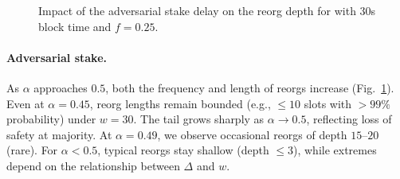 \begin{figure}[htbp!]
\caption{Impact of the adversarial stake delay on the reorg depth for \ProjBase with 30s block time and $f=0.25$.}
\label{fig:adversarial}
\end{figure}

\paragraph{Adversarial stake.}
As $\alpha$ approaches $0.5$, both the frequency and length of reorgs increase (Fig.~\ref{fig:adversarial}). Even at $\alpha=0.45$, reorg lengths remain bounded (e.g., $\le 10$ slots with $>99\%$ probability) under $w=30$. The tail grows sharply as $\alpha\to 0.5$, reflecting loss of safety at majority. At $\alpha=0.49$, we observe occasional reorgs of depth $15$--$20$ (rare). For $\alpha<0.5$, typical reorgs stay shallow (depth $\le 3$), while extremes depend on the relationship between $\Delta$ and $w$.


